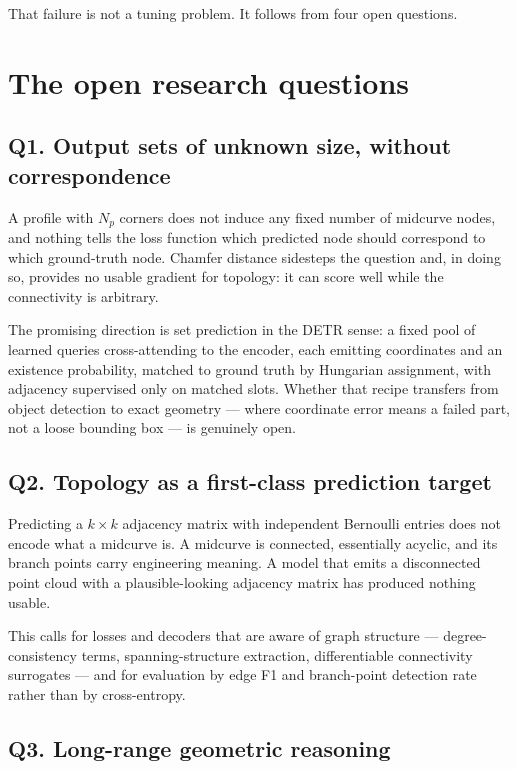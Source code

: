\documentclass[10pt,twocolumn]{article}
\begin{document}
That failure is not a tuning problem. It follows from four open questions.

\section{The open research questions}

\subsection{Q1. Output sets of unknown size, without correspondence}

A profile with $N_p$ corners does not induce any fixed number of midcurve
nodes, and nothing tells the loss function which predicted node should
correspond to which ground-truth node. Chamfer distance sidesteps the question
and, in doing so, provides no usable gradient for topology: it can score well
while the connectivity is arbitrary.

The promising direction is set prediction in the DETR sense: a fixed pool of
learned queries cross-attending to the encoder, each emitting coordinates and
an existence probability, matched to ground truth by Hungarian assignment, with
adjacency supervised only on matched slots. Whether that recipe transfers from
object detection to exact geometry --- where coordinate error means a failed
part, not a loose bounding box --- is genuinely open.

\subsection{Q2. Topology as a first-class prediction target}

Predicting a $k \times k$ adjacency matrix with independent Bernoulli entries
does not encode what a midcurve is. A midcurve is connected, essentially
acyclic, and its branch points carry engineering meaning. A model that emits a
disconnected point cloud with a plausible-looking adjacency matrix has produced
nothing usable.

This calls for losses and decoders that are aware of graph structure ---
degree-consistency terms, spanning-structure extraction, differentiable
connectivity surrogates --- and for evaluation by edge F1 and branch-point
detection rate rather than by cross-entropy.

\subsection{Q3. Long-range geometric reasoning}
\end{document}

